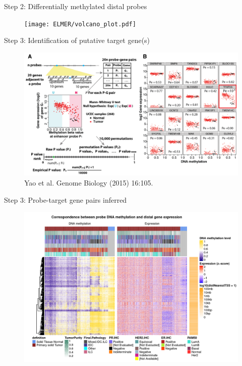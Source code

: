 \documentclass[slidestop,compress,11pt,xcolor=dvipsnames]{beamer}
\begin{document}
\begin{frame}{Step 2: Differentially methylated distal probes}
 \begin{figure}
  \centering
  \texttt{[image: ELMER/volcano\_plot.pdf]}
 \end{figure}
\end{frame}

\begin{frame}{Step 3: Identification of putative target gene(s)}
 \vspace*{-0.3cm}
 \begin{figure}
  \centering
  \includegraphics[width=1.0\linewidth]{ELMER/pair.png}{\tiny{\\Yao et al. Genome Biology (2015) 16:105.}}
 \end{figure}
\end{frame}




\begin{frame}{Step 3: Probe-target gene pairs inferred}
 \vspace*{-0.3cm}
 \begin{figure}
  \centering
  \includegraphics[width=1.0\linewidth]{ELMER/heatmappair.jpg}
 \end{figure}
\end{frame}
\end{document}
